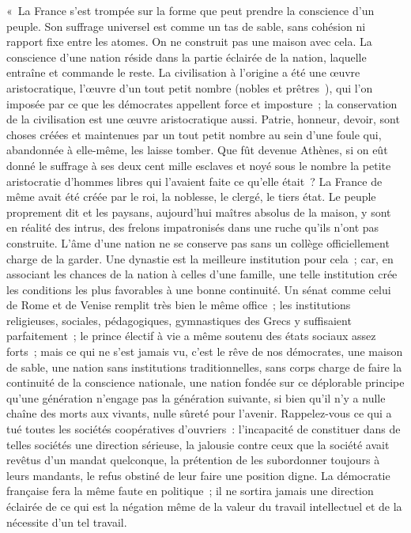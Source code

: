 \documentclass[french,twoside]{book} %
\newenvironment{quoteblock}%
  {\begin{quoting}}
  {\end{quoting}}
\newenvironment{quotebar}{%
    \def\FrameCommand{{\color{rubric!10!}\vrule width 0.5em} \hspace{0.9em}}%
    \def\OuterFrameSep{\itemsep} %
    \MakeFramed {\advance\hsize-\width \FrameRestore}
  }%
  {%
    \endMakeFramed
  }
\renewenvironment{quoteblock}%
  {%
    \savenotes
    \setstretch{0.9}
    \normalfont
    \begin{quotebar}
  }
  {%
    \end{quotebar}
    \spewnotes
  }
\begin{document}
\begin{quoteblock}
 « La France s’est trompée sur la forme que peut prendre la conscience d’un peuple. Son suffrage universel est comme un tas de sable, sans cohésion ni rapport fixe entre les atomes. On ne construit pas une maison avec cela. La conscience d’une nation réside dans la partie éclairée de la nation, laquelle entraîne et commande le reste. La civilisation à l’origine a été une œuvre aristocratique, l’œuvre d’un tout petit nombre (nobles et prêtres ), qui l’on imposée par ce que les démocrates appellent force et imposture ; la conservation de la civilisation est une œuvre aristocratique aussi. Patrie, honneur, devoir, sont choses créées et maintenues par un tout petit nombre au sein d’une foule qui, abandonnée à elle-même, les laisse tomber. Que fût devenue Athènes, si on eût donné le suffrage à ses deux cent mille esclaves et noyé sous le nombre la petite aristocratie d’hommes libres qui l’avaient faite ce qu’elle était ? La France de même avait été créée par le roi, la noblesse, le clergé, le tiers état. Le peuple proprement dit et les paysans, aujourd’hui maîtres absolus de la maison, y sont en réalité des intrus, des frelons impatronisés dans une ruche qu’ils n’ont pas construite. L’âme d’une nation ne se conserve pas sans un collège officiellement charge de la garder. Une dynastie est la meilleure institution pour cela ; car, en associant les chances de la nation à celles d’une famille, une telle institution crée les conditions les plus favorables à une bonne continuité. Un sénat comme celui de Rome et de Venise remplit très bien le même office ; les institutions religieuses, sociales, pédagogiques, gymnastiques des Grecs y suffisaient parfaitement ; le prince électif à vie a même soutenu des états sociaux assez forts ; mais ce qui ne s’est jamais vu, c’est le rêve de nos démocrates, une maison de sable, une nation sans institutions traditionnelles, sans corps charge de faire la continuité de la conscience nationale, une nation fondée sur ce déplorable principe qu’une génération n’engage pas la génération suivante, si bien qu’il n’y a nulle chaîne des morts aux vivants, nulle sûreté pour l’avenir. Rappelez-vous ce qui a tué toutes les sociétés coopératives d’ouvriers : l’incapacité de constituer dans de telles sociétés une direction sérieuse, la jalousie contre ceux que la société avait revêtus d’un mandat quelconque, la prétention de les subordonner toujours à leurs mandants, le refus obstiné de leur faire une position digne. La démocratie française fera la même faute en politique ; il ne sortira jamais une direction éclairée de ce qui est la négation même de la valeur du travail intellectuel et de la nécessite d’un tel travail.\par

\end{quoteblock}
\end{document}
